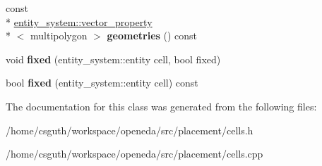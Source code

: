 \begin{DoxyCompactItemize}
\item 
\hypertarget{classophidian_1_1placement_1_1cells_a0a45d3ff704cfdb98d0d2b532a991fac}{const \\*
\hyperlink{classophidian_1_1entity__system_1_1vector__property}{entity\-\_\-system\-::vector\-\_\-property}\\*
$<$ multipolygon $>$ {\bfseries geometries} () const }\label{classophidian_1_1placement_1_1cells_a0a45d3ff704cfdb98d0d2b532a991fac}

\item 
\hypertarget{classophidian_1_1placement_1_1cells_a4a8faf318911e68b8c00ca3759eb93ed}{void {\bfseries fixed} (entity\-\_\-system\-::entity cell, bool fixed)}\label{classophidian_1_1placement_1_1cells_a4a8faf318911e68b8c00ca3759eb93ed}

\item 
\hypertarget{classophidian_1_1placement_1_1cells_a924de0b1f359eb202edc3a4d3da7ab9f}{bool {\bfseries fixed} (entity\-\_\-system\-::entity cell) const }\label{classophidian_1_1placement_1_1cells_a924de0b1f359eb202edc3a4d3da7ab9f}

\end{DoxyCompactItemize}


The documentation for this class was generated from the following files\-:\begin{DoxyCompactItemize}
\item 
/home/csguth/workspace/openeda/src/placement/cells.\-h\item 
/home/csguth/workspace/openeda/src/placement/cells.\-cpp\end{DoxyCompactItemize}
